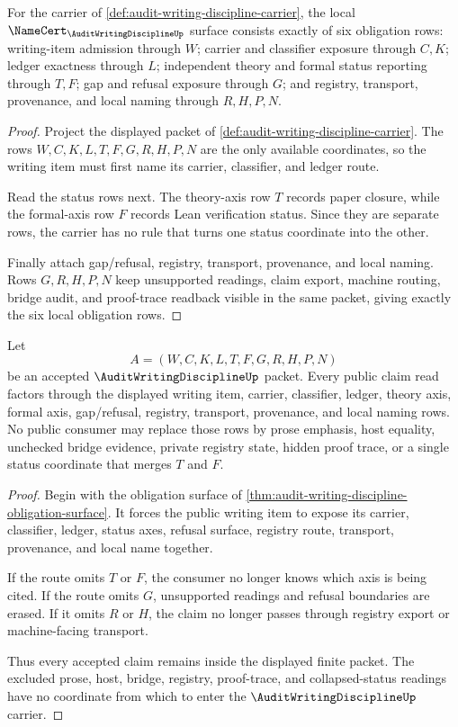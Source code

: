 \begin{theorem}
\label{thm:audit-writing-discipline-obligation-surface}
For the carrier of \autoref{def:audit-writing-discipline-carrier}, the local $\NameCert_{\AuditWritingDisciplineUp}$ surface consists exactly of six obligation rows: writing-item admission through $W$; carrier and classifier exposure through $C,K$; ledger exactness through $L$; independent theory and formal status reporting through $T,F$; gap and refusal exposure through $G$; and registry, transport, provenance, and local naming through $R,H,P,N$.
\end{theorem}
\begin{proof}
Project the displayed packet of \autoref{def:audit-writing-discipline-carrier}. The rows $W,C,K,L,T,F,G,R,H,P,N$ are the only available coordinates, so the writing item must first name its carrier, classifier, and ledger route.

Read the status rows next. The theory-axis row $T$ records paper closure, while the formal-axis row $F$ records Lean verification status. Since they are separate rows, the carrier has no rule that turns one status coordinate into the other.

Finally attach gap/refusal, registry, transport, provenance, and local naming. Rows $G,R,H,P,N$ keep unsupported readings, claim export, machine routing, bridge audit, and proof-trace readback visible in the same packet, giving exactly the six local obligation rows.
\end{proof}

\begin{theorem}
\label{thm:audit-writing-discipline-nonescape}
Let
$$
A=(W,C,K,L,T,F,G,R,H,P,N)
$$
be an accepted $\AuditWritingDisciplineUp$ packet. Every public claim read factors through the displayed writing item, carrier, classifier, ledger, theory axis, formal axis, gap/refusal, registry, transport, provenance, and local naming rows. No public consumer may replace those rows by prose emphasis, host equality, unchecked bridge evidence, private registry state, hidden proof trace, or a single status coordinate that merges $T$ and $F$.
\end{theorem}
\begin{proof}
Begin with the obligation surface of \autoref{thm:audit-writing-discipline-obligation-surface}. It forces the public writing item to expose its carrier, classifier, ledger, status axes, refusal surface, registry route, transport, provenance, and local name together.

If the route omits $T$ or $F$, the consumer no longer knows which axis is being cited. If the route omits $G$, unsupported readings and refusal boundaries are erased. If it omits $R$ or $H$, the claim no longer passes through registry export or machine-facing transport.

Thus every accepted claim remains inside the displayed finite packet. The excluded prose, host, bridge, registry, proof-trace, and collapsed-status readings have no coordinate from which to enter the $\AuditWritingDisciplineUp$ carrier.
\end{proof}

